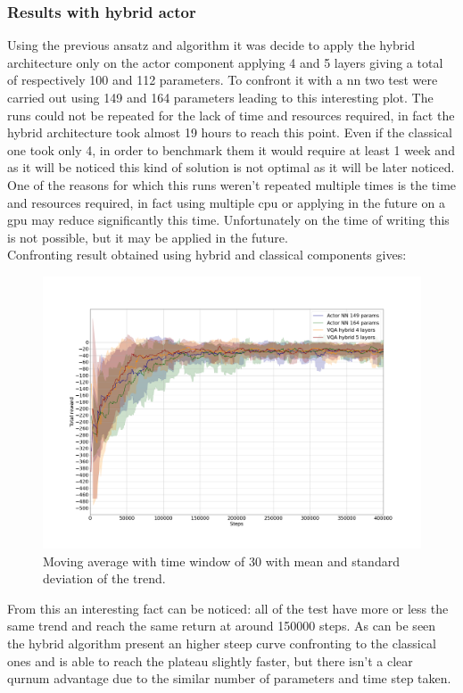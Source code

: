 \subsubsection{Results with hybrid actor}
Using the previous ansatz and algorithm it was decide to apply the hybrid architecture only on the actor component applying 4 and 5 layers giving a total of respectively 100 and 112 parameters.
To confront it with a \acrshort{nn} two test were carried out using 149 and 164 parameters leading to this interesting plot. The runs could not be repeated for the lack of time and resources required, in fact the hybrid architecture took almost 19 hours to reach this point. Even if the classical one took only 4, in order to benchmark them it would require at least 1 week and as it will be noticed this kind of solution is not optimal as it will be later noticed.
One of the reasons for which this runs weren't repeated multiple times is the time and resources required, in  fact using multiple cpu or applying in the future on a gpu may reduce significantly this time. Unfortunately on the time of writing this is not possible, but it may be applied in the future.\\
Confronting result obtained using hybrid and classical components gives:  
\begin{figure}[H]
	\centering
	\includegraphics[width=0.8\linewidth]{"img/VQA and classic actor"}
	\caption{Moving average with time window of 30 with mean and standard deviation of the trend.}
	\label{fig:vqa-and-classic-actor}
\end{figure}
From this an interesting fact can be noticed: all of the test have more or less the same trend and reach the same return at around 150000 steps. As can be seen the hybrid algorithm present an higher steep curve confronting to the classical ones and is able to reach the plateau slightly faster, but there isn't a clear qurnum advantage due to the similar number of parameters and time step taken.
